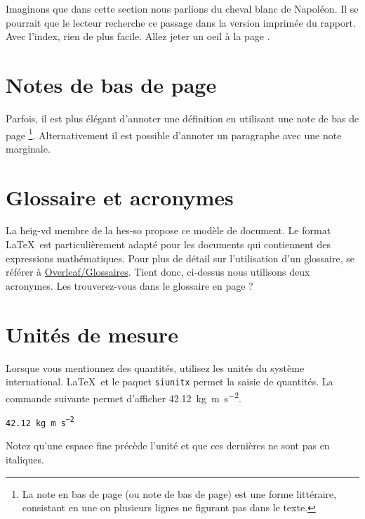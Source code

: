 
Imaginons que dans cette section nous parlions du cheval blanc  de Napoléon. Il se pourrait que le lecteur recherche ce passage dans la version imprimée du rapport. Avec l'index, rien de plus facile. Allez jeter un oeil à la page \pageref{index}.

\section{Notes de bas de page}

 Parfois, il est plus élégant d'annoter une définition en utilisant une note de bas de page \footnote{La note en bas de page (ou note de bas de page) est une forme littéraire, consistant en une ou plusieurs lignes ne figurant pas dans le texte.}. Alternativement il est possible d'annoter un paragraphe avec une note marginale.

\section{Glossaire et acronymes}

La \Gls{heig-vd} membre de la \Gls{hes-so} propose ce modèle de document. Le format \LaTeX~est particulièrement adapté pour les documents qui contiennent des expressions mathématiques. Pour plus de détail sur l'utilisation d'un glossaire, se référer à \href{https://www.overleaf.com/learn/latex/Glossaries}{Overleaf/Glossaires}. Tient donc, ci-dessus nous utilisons deux acronymes. Les trouverez-vous dans le glossaire en page \pageref{glossaire} ?

\section{Unités de mesure}

Lorsque vous mentionnez des quantités, utilisez les unités du système international. \LaTeX~et le paquet \texttt{siunitx} permet la saisie de quantités. La commande suivante permet d'afficher \SI{42.12}{\kilo\gram\metre\per\square\second}.\par

\texttt{\SI{42.12}{\kilo\gram\metre\per\square\second}}\par

Notez qu'une espace fine précède l'unité et que ces dernières ne sont pas en italiques.
